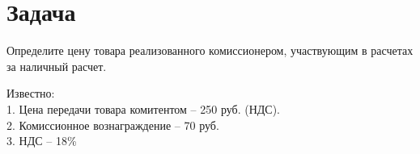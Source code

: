 \section{Задача}
Определите цену товара реализованного комиссионером,
участвующим в расчетах за наличный расчет.

Известно:\\
1. Цена передачи товара комитентом – 250 руб. (НДС).\\
2. Комиссионное вознаграждение – 70 руб.\\
3. НДС – 18\%
